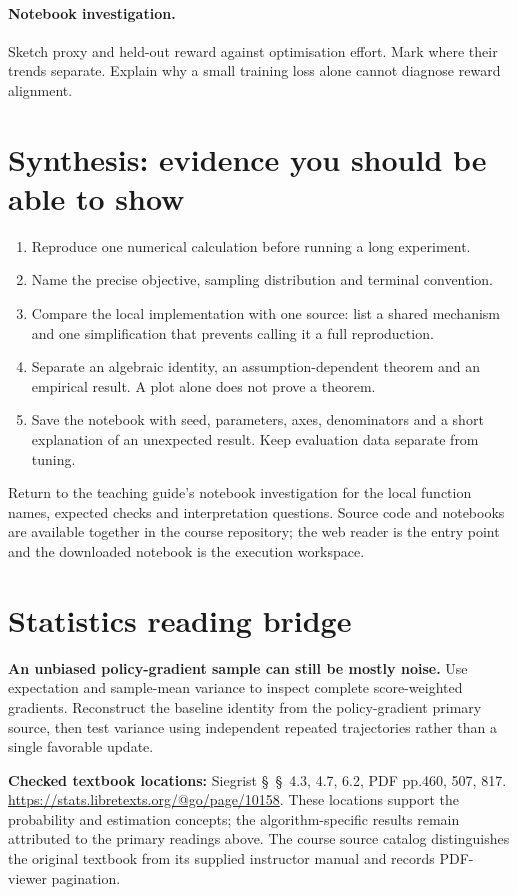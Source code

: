 \documentclass[11pt]{scrartcl}
\begin{document}
\paragraph{Notebook investigation.} Sketch proxy and held-out reward against optimisation effort. Mark where their trends separate. Explain why a small training loss alone cannot diagnose reward alignment.

\section*{Synthesis: evidence you should be able to show}
\begin{enumerate}
\item Reproduce one numerical calculation before running a long experiment.
\item Name the precise objective, sampling distribution and terminal convention.
\item Compare the local implementation with one source: list a shared mechanism
and one simplification that prevents calling it a full reproduction.
\item Separate an algebraic identity, an assumption-dependent theorem and an
empirical result. A plot alone does not prove a theorem.
\item Save the notebook with seed, parameters, axes, denominators and a short
explanation of an unexpected result. Keep evaluation data separate from tuning.
\end{enumerate}
Return to the teaching guide's notebook investigation for the local function
names, expected checks and interpretation questions. Source code and notebooks
are available together in the course repository; the web reader is the entry
point and the downloaded notebook is the execution workspace.
\section*{Statistics reading bridge}
\textbf{An unbiased policy-gradient sample can still be mostly noise.} Use expectation and sample-mean variance to inspect complete score-weighted gradients. Reconstruct the baseline identity from the policy-gradient primary source, then test variance using independent repeated trajectories rather than a single favorable update.

\textbf{Checked textbook locations:} Siegrist \S~\S~4.3, 4.7, 6.2, PDF pp.460, 507, 817. \url{https://stats.libretexts.org/@go/page/10158}. These locations support the probability and estimation concepts; the algorithm-specific results remain attributed to the primary readings above. The course source catalog distinguishes the original textbook from its supplied instructor manual and records PDF-viewer pagination.
\end{document}
